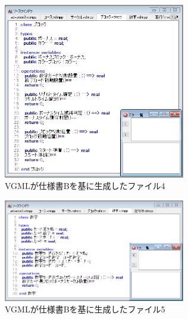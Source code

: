 \begin{figure}[tp]
    \begin{center}
    \includegraphics[width=300]{image/indicationB_vdm4.PNG}
    \caption{VGMLが仕様書Bを基に生成したファイル4}
    \label{fig:indicationB_vdm4}
    \end{center}
\end{figure}

\begin{figure}[tp]
    \begin{center}
    \includegraphics[width=300]{image/indicationB_vdm5.PNG}
    \caption{VGMLが仕様書Bを基に生成したファイル5}
    \label{fig:indicationB_vdm5}
    \end{center}
\end{figure}

